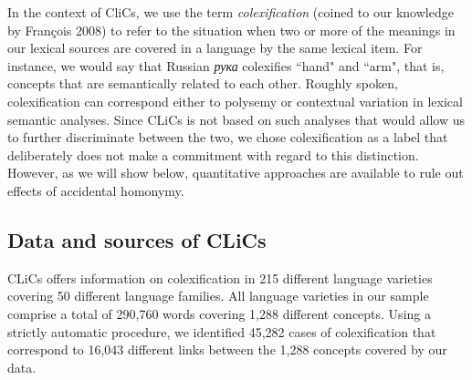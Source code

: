 In the context of CliCs, we use the term \emph{colexification} (coined to our knowledge by François
2008) \nocite{francois2008}
to refer to the situation when two or more of the meanings in our lexical sources are covered in a
language by the same lexical item. For instance, we would say that Russian \emph{рука} colexifies ``hand"
and ``arm", that is, concepts that are semantically related to each other. Roughly spoken,
colexification can correspond either to polysemy or contextual variation in lexical semantic analyses.
Since CLiCs is not based on such analyses that would allow us to further discriminate between the
two, we chose colexification as a label that deliberately does not make a commitment with regard to
this distinction. However, as we will show below, quantitative approaches are available to rule out effects of accidental homonymy. 

\subsection{Data and sources of CLiCs}
CLiCs offers information on colexification in 215 different language varieties
covering 50 different language families. All language varieties in our sample comprise a total of
290,760 words covering 1,288 different concepts. Using a strictly automatic procedure, we identified
45,282 cases of colexification that correspond to 16,043 different links between the 1,288 concepts
covered by our data. 

